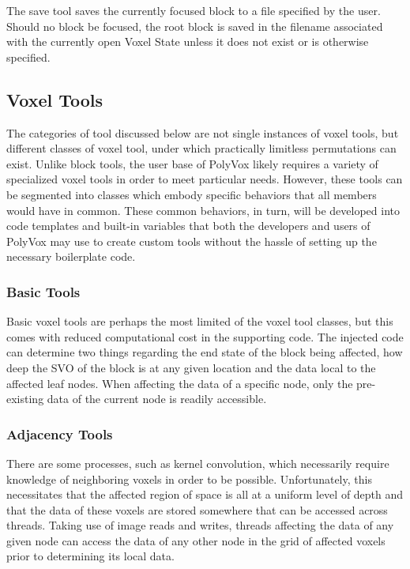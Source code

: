 \documentclass[onecolumn, draftclsnofoot,10pt, compsoc]{IEEEtran}
\begin{document}
The save tool saves the currently focused block to a file specified by the user. Should no block be focused, the root block is saved in the filename associated with the currently open Voxel State unless it does not exist or is otherwise specified.



\subsection{Voxel Tools}

The categories of tool discussed below are not single instances of voxel tools, but different classes of voxel tool, under which practically limitless permutations can exist. Unlike block tools, the user base of PolyVox likely requires a variety of specialized voxel tools in order to meet particular needs. However, these tools can be segmented into classes which embody specific behaviors that all members would have in common. These common behaviors, in turn, will be developed into code templates and built-in variables that both the developers and users of PolyVox may use to create custom tools without the hassle of setting up the necessary boilerplate code.

\subsubsection{Basic Tools}

Basic voxel tools are perhaps the most limited of the voxel tool classes, but this comes with reduced computational cost in the supporting code. The injected code can determine two things regarding the end state of the block being affected, how deep the SVO of the block is at any given location and the data local to the affected leaf nodes. When affecting the data of a specific node, only the pre-existing data of the current node is readily accessible.

\subsubsection{Adjacency Tools}

There are some processes, such as kernel convolution, which necessarily require knowledge of neighboring voxels in order to be possible. Unfortunately, this necessitates that the affected region of space is all at a uniform level of depth and that the data of these voxels are stored somewhere that can be accessed across threads. Taking use of image reads and writes, threads affecting the data of any given node can access the data of any other node in the grid of affected voxels prior to determining its local data.
\end{document}
